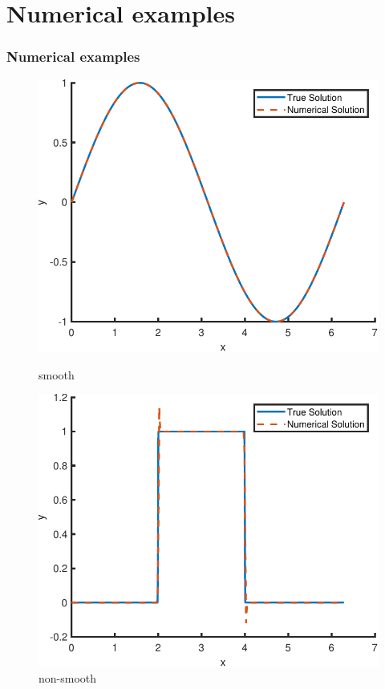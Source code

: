 \documentclass{beamer}
\begin{document}
\section{Numerical examples}
\begin{frame}
    \frametitle{Numerical examples}
    \begin{figure}
        \centering
        \begin{minipage}{0.35\linewidth}
            \centering
            \includegraphics[width=\linewidth]{images/cellAveragecontinue.pdf}
            \caption{smooth}
        \end{minipage}
        \hspace{1cm}
        \begin{minipage}{0.35\linewidth}
            \centering
            \includegraphics[width=\linewidth]{images/cellAverageDiscontinue.pdf}
            \caption{non-smooth}
        \end{minipage}


\end{figure}
\end{frame}
\end{document}
